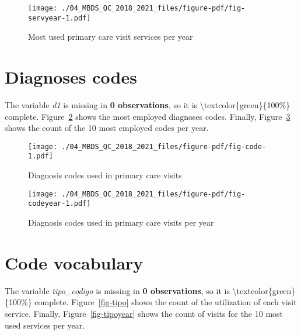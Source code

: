 \documentclass[
  letterpaper,
  DIV=11,
  numbers=noendperiod]{scrreprt}
\begin{document}
\begin{figure}

{\centering \texttt{[image: ./04\_MBDS\_QC\_2018\_2021\_files/figure-pdf/fig-servyear-1.pdf]}

}

\caption{\label{fig-servyear}Most used primary care visit services per
year}

\end{figure}

\hypertarget{diagnoses-codes-1}{%
\section{Diagnoses codes}\label{diagnoses-codes-1}}

The variable \emph{d1} is missing in \textbf{0 observations}, so it is
\textbackslash textcolor\{green\}\{100\%\} complete.
Figure~\ref{fig-code} shows the most employed diagnoses codes. Finally,
Figure~\ref{fig-codeyear} shows the count of the 10 most employed codes
per year.

\begin{figure}

{\centering \texttt{[image: ./04\_MBDS\_QC\_2018\_2021\_files/figure-pdf/fig-code-1.pdf]}

}

\caption{\label{fig-code}Diagnosis codes used in primary care visits}

\end{figure}

\begin{figure}

{\centering \texttt{[image: ./04\_MBDS\_QC\_2018\_2021\_files/figure-pdf/fig-codeyear-1.pdf]}

}

\caption{\label{fig-codeyear}Diagnosis codes used in primary care visits
per year}

\end{figure}

\hypertarget{code-vocabulary-1}{%
\section{Code vocabulary}\label{code-vocabulary-1}}

The variable \emph{tipo\_codigo} is missing in \textbf{0 observations},
so it is \textbackslash textcolor\{green\}\{100\%\} complete.
Figure~\ref{fig-tipo} shows the count of the utilization of each visit
service. Finally, Figure~\ref{fig-tipoyear} shows the count of visits
for the 10 most used services per year.
\end{document}
